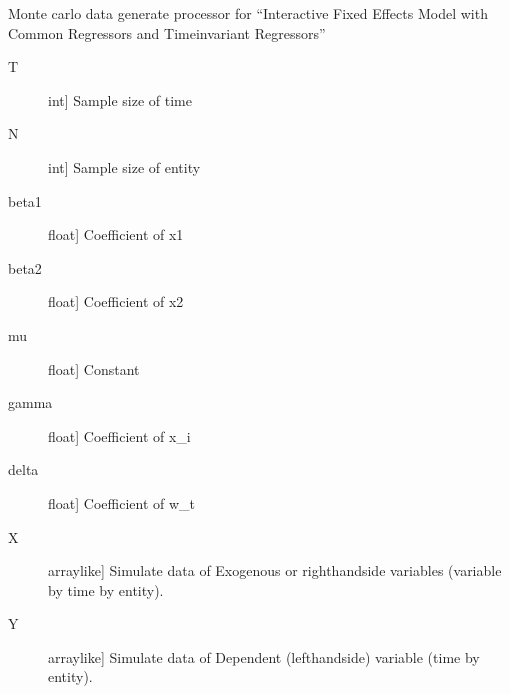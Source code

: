 \documentclass[a4paper,11pt,english]{sphinxmanual}
\begin{document}
\begin{fulllineitems}
\label{\detokenize{analysis:src.analysis.monte_carlo_dgp.dgp_interactive_fixed_effects_model_with_common_and_time_invariant_no_iid}}
\sphinxAtStartPar
Monte carlo data generate processor for “Interactive Fixed Effects Model with Common
Regressors and Time\sphinxhyphen{}invariant Regressors”
\begin{description}
\item[{T}] \leavevmode{[}int{]}
\sphinxAtStartPar
Sample size of time

\item[{N}] \leavevmode{[}int{]}
\sphinxAtStartPar
Sample size of entity

\item[{beta1}] \leavevmode{[}float{]}
\sphinxAtStartPar
Coefficient of x1

\item[{beta2}] \leavevmode{[}float{]}
\sphinxAtStartPar
Coefficient of x2

\item[{mu}] \leavevmode{[}float{]}
\sphinxAtStartPar
Constant

\item[{gamma}] \leavevmode{[}float{]}
\sphinxAtStartPar
Coefficient of x\_i

\item[{delta}] \leavevmode{[}float{]}
\sphinxAtStartPar
Coefficient of w\_t

\end{description}
\begin{description}
\item[{X}] \leavevmode{[}array\sphinxhyphen{}like{]}
\sphinxAtStartPar
Simulate data of Exogenous or right\sphinxhyphen{}hand\sphinxhyphen{}side variables (variable by time by
entity).

\item[{Y}] \leavevmode{[}array\sphinxhyphen{}like{]}
\sphinxAtStartPar
Simulate data of Dependent (left\sphinxhyphen{}hand\sphinxhyphen{}side) variable (time by entity).


\end{description}
\end{fulllineitems}
\end{document}
